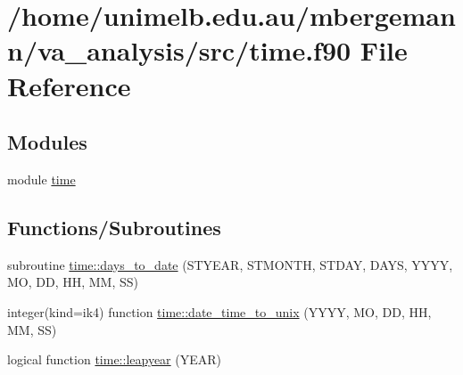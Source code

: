 \hypertarget{time_8f90}{}\section{/home/unimelb.edu.\+au/mbergemann/va\+\_\+analysis/src/time.f90 File Reference}
\label{time_8f90}
\subsection*{Modules}
\begin{DoxyCompactItemize}
\item 
module \hyperlink{namespacetime}{time}
\end{DoxyCompactItemize}
\subsection*{Functions/\+Subroutines}
\begin{DoxyCompactItemize}
\item 
subroutine \hyperlink{namespacetime_a29670e6cf798cee7d9e33201b38f9507}{time\+::days\+\_\+to\+\_\+date} (S\+T\+Y\+E\+AR, S\+T\+M\+O\+N\+TH, S\+T\+D\+AY, D\+A\+YS, Y\+Y\+YY, MO, DD, HH, MM, SS)
\item 
integer(kind=ik4) function \hyperlink{namespacetime_a7c66adfc707644b0644b33e1557f1486}{time\+::date\+\_\+time\+\_\+to\+\_\+unix} (Y\+Y\+YY, MO, DD, HH, MM, SS)
\item 
logical function \hyperlink{namespacetime_ac7f82d40fd2b49e7e9025b103e88555c}{time\+::leapyear} (Y\+E\+AR)
\end{DoxyCompactItemize}
